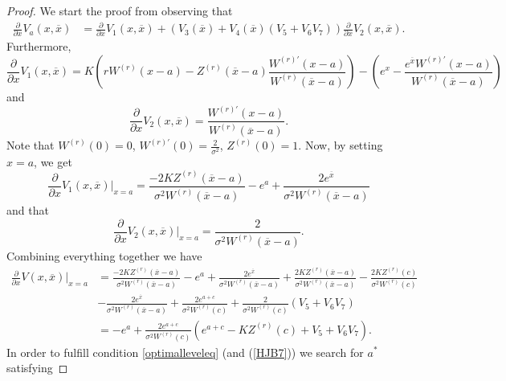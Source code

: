 \documentclass[10pt]{amsart}
\begin{document}
		\begin{proof}
			We start the proof from observing that
			\begin{align*}
				\frac{\partial}{\partial x} V_a(x, \overline{x})%
				&= \frac{\partial}{\partial x} V_1(x, \overline{x}) + (V_3(\overline{x}) +  V_4(\overline{x})( V_5 + V_6 V_7 ) )\frac{\partial}{\partial x} V_2(x, \overline{x}).
			\end{align*}
			Furthermore,
			\begin{equation*}
				\frac{\partial}{\partial x} V_1(x, \overline{x})  = K\left( rW^{(r)}(x-a) - Z^{(r)}(\overline{x}-a)\frac{W^{(r)'}(x-a)}{W^{(r)}(\overline{x}-a)} \right) - \left( e^x - \frac{e^{\overline{x}}W^{(r)'}(x-a)}{W^{(r)}(\overline{x}-a)} \right)
			\end{equation*}
			and
			\begin{equation*}
				\frac{\partial}{\partial x} V_2(x, \overline{x})  = \frac{W^{(r)'}(x-a)}{W^{(r)}(\overline{x}-a)}.
			\end{equation*}
			Note that $W^{(r)}(0) = 0$, $W^{(r)'}(0) = \frac{2}{\sigma^2}$, $Z^{(r)}(0) = 1$. Now, by setting $x = a$, we get
			\begin{equation*}
				\frac{\partial}{\partial x} V_1(x, \overline{x})\big|_{x = a}  = \frac{-2K  Z^{(r)}(\overline{x}-a)}{\sigma^2W^{(r)}(\overline{x}-a)}  -  e^a + \frac{2e^{\overline{x}}}{\sigma^2W^{(r)}(\overline{x}-a)}
			\end{equation*}
			and that
			\begin{equation*}
				\frac{\partial}{\partial x} V_2(x, \overline{x})\big|_{x = a}  = \frac{2}{\sigma^2W^{(r)}(\overline{x}-a)}.
			\end{equation*}
			Combining everything together we have
			\begin{align*}
				\frac{\partial}{\partial x} V(x, \overline{x})\big|_{x = a}  &= \frac{-2K  Z^{(r)}(\overline{x}-a)}{\sigma^2W^{(r)}(\overline{x}-a)}  -  e^a + \frac{2e^{\overline{x}}}{\sigma^2W^{(r)}(\overline{x}-a)} +
				\frac{2K  Z^{(r)}(\overline{x}-a)}{\sigma^2W^{(r)}(\overline{x}-a)} - \frac{2KZ^{(r)}(c)}{\sigma^2W^{(r)}(c)} \\
				\nonumber & - \frac{2e^{\overline{x}}}{\sigma^2W^{(r)}(\overline{x}-a)} + \frac{2e^{a+c}}{\sigma^2W^{(r)}(c)} + \frac{2}{\sigma^2W^{(r)}(c)}(V_5 + V_6 V_7) \\
				\nonumber & = -e^a + \frac{2e^{a+c}}{\sigma^2W^{(r)}(c)}\left(e^{a+c} - KZ^{(r)}(c) + V_5 + V_6 V_7 \right).
			\end{align*}
			In order to fulfill condition \eqref{optimalleveleq} (and (\ref{HJB7})) we search for $a^*$ satisfying

\end{proof}
\end{document}
